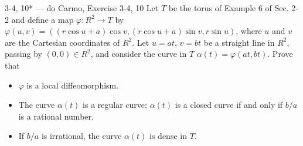 \begin{exercise}{3-4, 10* — do Carmo, Exercise 3-4, 10}
Let $T$ be the torus of Example 6 of Sec. 2-2 and define a map $\varphi \colon R^2 \to T$ by $\varphi (u, v) = \left(\left(r \cos u + a\right) \cos v, \left(r \cos u + a\right) \sin v, r \sin u\right)$, where $u$ and $v$ are the Cartesian coordinates of $R^2$. Let $u = at$, $v = bt$ be a straight line in $R^2$, passing by $(0, 0) \in R^2$, and consider the curve in $T$ $\alpha(t) = \varphi(at, bt)$. Prove that
\begin{itemize}
\item[a.] $\varphi$ is a local diffeomorphism.
\item[b.] The curve $\alpha(t)$ is a regular curve; $\alpha(t)$ is a closed curve if and only if $b / a$ is a rational number.
\item[c.] If $b / a$ is irrational, the curve $\alpha(t)$ is dense in $T$.
\end{itemize}
\end{exercise}
